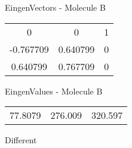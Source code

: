 \begin{multicols}{2}
\begin{center}
\vtab
 EingenVectors - Molecule B     \\
\vtab
\begin{tabular}{|c c c|}
0	 & 	0	 & 	1	 \\
-0.767709	 & 	0.640799	 & 	0	 \\
0.640799	 & 	0.767709	 & 	0
\end{tabular}

\vtab
 EingenValues - Molecule B     \\
\vtab
\begin{tabular}{|c c c|}
77.8079	 & 	276.009	 & 	320.597	 \\
\end{tabular}

\end{center}
\end{multicols}
\begin{center}
\vtab
\vtab
\textcolor{NavyBlue}{\Large Different}
\end{center}

 \newpage

